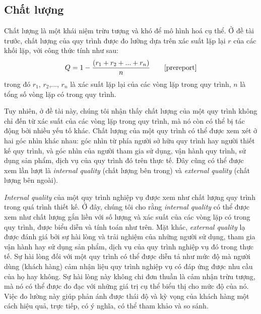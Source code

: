 \subsection{Chất lượng}
Chất lượng là một khái niệm trừu tượng và khó để mô hình hoá cụ thể. Ở đề tài trước, chất lượng của quy trình được đo lường dựa trên xác suất lặp lại $r$ của các khối lặp, với công thức tính như sau:
\[ Q = 1 - \frac{(r_1 + r_2 + ... + r_n)}{n} \tag*{\cite{prereport}}\]
trong đó $r_1$, $r_2$,..., $r_n$ là xác suất lặp lại của các vòng lặp trong quy trình, $n$ là tổng số vòng lặp có trong quy trình.
\par
Tuy nhiên, ở đề tài này, chúng tôi nhận thấy chất lượng của một quy trình không chỉ đến từ xác suất của các vòng lặp trong quy trình, mà nó còn có thể bị tác động bởi nhiều yếu tố khác. Chất lượng của một quy trình có thể được xem xét ở hai góc nhìn khác nhau: góc nhìn từ phía người sở hữu quy trình hay người thiết kế quy trình, và góc nhìn của người tham gia sử dụng, vận hành quy trình, sử dụng sản phẩm, dịch vụ của quy trình đó trên thực tế. Đây cũng có thể được xem lần lượt là \emph{internal quality} (chất lượng bên trong) và \emph{external quality} (chất lượng bên ngoài). 
\par
\emph{Internal quality} của một quy trình nghiệp vụ được xem như chất lượng quy trình trong quá trình thiết kế. Ở đây, chúng tôi cho rằng \emph{internal quality} có thể được xem như chất lượng gắn liền với số lượng và xác suất của các vòng lặp có trong quy trình, được biểu diễn và tính toán như trên. Mặt khác, \emph{external quality} lạ được đánh giá bởi sự hài lòng và trải nghiệm của những người sử dụng, tham gia vận hành hay sử dụng sản phẩm, dịch vụ của quy trình nghiệp vụ đó trong thực tế. Sự hài lòng đối với một quy trình có thể được diễn tả như mức độ mà người dùng (khách hàng) cảm nhận liệu quy trình nghiệp vụ có đáp ứng được nhu cầu của họ hay không. Sự hài lòng này không chi đơn thuần là cảm nhận trừu tượng, mà nó có thể được đo đạc với những giá trị cụ thể biểu thị cho mức độ của nó. Việc đo lường này giúp phản ánh được thái độ và kỳ vọng của khách hàng một cách hiệu quả, trực tiếp, có ý nghĩa, có thể tham khảo và so sánh. 
